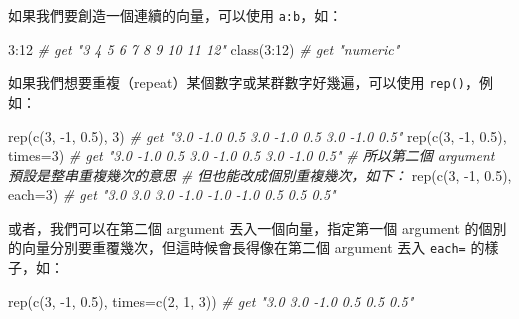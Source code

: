 \documentclass[
]{book}
\newenvironment{Shaded}{\begin{snugshade}}{\end{snugshade}}
\newcommand{\AttributeTok}[1]{\textcolor[rgb]{0.77,0.63,0.00}{#1}}
\newcommand{\CommentTok}[1]{\textcolor[rgb]{0.56,0.35,0.01}{\textit{#1}}}
\newcommand{\DecValTok}[1]{\textcolor[rgb]{0.00,0.00,0.81}{#1}}
\newcommand{\FloatTok}[1]{\textcolor[rgb]{0.00,0.00,0.81}{#1}}
\newcommand{\FunctionTok}[1]{\textcolor[rgb]{0.00,0.00,0.00}{#1}}
\newcommand{\NormalTok}[1]{#1}
\newcommand{\SpecialCharTok}[1]{\textcolor[rgb]{0.00,0.00,0.00}{#1}}
\theoremstyle{definition}
\theoremstyle{remark}
\begin{document}
如果我們要創造一個連續的向量，可以使用 \texttt{a:b}，如：

\begin{Shaded}
\begin{Highlighting}[]
\DecValTok{3}\SpecialCharTok{:}\DecValTok{12}  \CommentTok{\# get "3  4  5  6  7  8  9 10 11 12"}
\FunctionTok{class}\NormalTok{(}\DecValTok{3}\SpecialCharTok{:}\DecValTok{12}\NormalTok{)  }\CommentTok{\# get "\textquotesingle{}numeric\textquotesingle{}"}
\end{Highlighting}
\end{Shaded}

如果我們想要重複（repeat）某個數字或某群數字好幾遍，可以使用 \texttt{rep()}，例如：

\begin{Shaded}
\begin{Highlighting}[]
\FunctionTok{rep}\NormalTok{(}\FunctionTok{c}\NormalTok{(}\DecValTok{3}\NormalTok{, }\SpecialCharTok{{-}}\DecValTok{1}\NormalTok{, }\FloatTok{0.5}\NormalTok{), }\DecValTok{3}\NormalTok{)  }\CommentTok{\# get "3.0 {-}1.0  0.5  3.0 {-}1.0  0.5  3.0 {-}1.0  0.5"}
\FunctionTok{rep}\NormalTok{(}\FunctionTok{c}\NormalTok{(}\DecValTok{3}\NormalTok{, }\SpecialCharTok{{-}}\DecValTok{1}\NormalTok{, }\FloatTok{0.5}\NormalTok{), }\AttributeTok{times=}\DecValTok{3}\NormalTok{)  }\CommentTok{\# get "3.0 {-}1.0  0.5  3.0 {-}1.0  0.5  3.0 {-}1.0  0.5"}
\CommentTok{\# 所以第二個 argument 預設是整串重複幾次的意思}
\CommentTok{\# 但也能改成個別重複幾次，如下：}
\FunctionTok{rep}\NormalTok{(}\FunctionTok{c}\NormalTok{(}\DecValTok{3}\NormalTok{, }\SpecialCharTok{{-}}\DecValTok{1}\NormalTok{, }\FloatTok{0.5}\NormalTok{), }\AttributeTok{each=}\DecValTok{3}\NormalTok{)  }\CommentTok{\# get "3.0  3.0  3.0 {-}1.0 {-}1.0 {-}1.0  0.5  0.5  0.5"}
\end{Highlighting}
\end{Shaded}

或者，我們可以在第二個 argument 丟入一個向量，指定第一個 argument 的個別的向量分別要重覆幾次，但這時候會長得像在第二個 argument 丟入 \texttt{each=} 的樣子，如：

\begin{Shaded}
\begin{Highlighting}[]
\FunctionTok{rep}\NormalTok{(}\FunctionTok{c}\NormalTok{(}\DecValTok{3}\NormalTok{, }\SpecialCharTok{{-}}\DecValTok{1}\NormalTok{, }\FloatTok{0.5}\NormalTok{), }\AttributeTok{times=}\FunctionTok{c}\NormalTok{(}\DecValTok{2}\NormalTok{, }\DecValTok{1}\NormalTok{, }\DecValTok{3}\NormalTok{)) }\CommentTok{\# get "3.0  3.0 {-}1.0  0.5  0.5  0.5"}
\end{Highlighting}
\end{Shaded}
\end{document}
